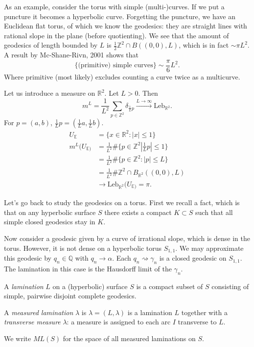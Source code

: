 \medskip\noindent
As an example, consider the torus with simple
(multi-)curves.
If we put a puncture it becomes a hyperbolic
curve.
Forgetting the puncture, we have an Euclidean
flat torus,
of which we know the geodesics: they are
straight lines
with rational slope in the plane (before
quotienting).
We see that the amount of geodesics of length
bounded by $L$
is $\frac{1}{2}\mathbb{Z}^2 \cap B((0,0),L)$,
which is in
fact $\sim \pi L^2$.
A result by Mc-Shane-Rivn, 2001 shows that
 $$
\{\text{(primitive) simple curves}\}\sim
\frac{\pi}{6}L^2.
$$
Where primitive (most likely) excludes
counting
a curve twice as a multicurve.


\medskip\noindent
Let us introduce a measure on $\mathbb{R}^2$.
Let $L>0$. Then
$$
m^L=\frac{1}{L^2}\sum_{p \in
\mathbb{Z}^2}\delta_{\frac{1}{L}p}
\xrightarrow{L \to
\infty}\text{Leb}_{\mathbb{R}^2}.
$$
For $p=(a,b)$,
$\frac{1}{L}p=(\frac{1}{L}a,\frac{1}{L}b)$.
$$
\begin{aligned}
U_{\mathbb{E}}&=\{x \in \mathbb{R}^2:|x|\leq
1\}\\
m^L(U_{\mathbb{E})}&=\frac{1}{L^2}\#\{p \in
\mathbb{Z}^2
\left|\frac{1}{L}p\right|\leq 1\}\\
&=\frac{1}{L^2}\#\{p \in \mathbb{Z}^2:|p|\leq
L\}\\
&=\frac{1}{L^2}\#\mathbb{Z}^2 \cap
B_{\mathbb{R}^2}((0,0),L)\\
&\to\text{Leb}_{\mathbb{R}^2}(U_{\mathbb{E})}
=\pi.
\end{aligned}
$$

\medskip\noindent
Let's go back to study the geodesics on a
torus.
First we recall a fact, which is that
on any hyperbolic surface $S$ there exists a
compact $K \subset S$ such that all
simple closed geodesics stay in $K$.

Now consider a geodesic given by a curve of
irrational slope,
which is dense in the torus. However,
it is not dense on a hyperbolic torus
$S_{1,1}$.
We may approximate this geodesic by $q_n \in
\mathbb{Q}$ with
$q_n \to \alpha$. Each $q_n \rightsquigarrow
\gamma_n$
is a closed geodesic on $S_{1,1}$.
The lamination in this case is the Hausdorff
limit
of the $\gamma_n$.

\begin{definition}
\label{definition-lamination}
A {\it lamination} $L$ on a (hyperbolic)
surface $S$
is a compact subset of $S$ consisting of
simple, pairwise
disjoint complete geodesics.

A {\it measured lamination} $\lambda$ is
$\lambda=(L,\lambda)$ is a lamination $L$
together with a {\it transverse measure}
$\lambda$:
a measure is assigned to each arc $I$
transverse to $L$.

We write $ML(S)$ for the space of all
measured laminations on $S$.
\end{definition}

